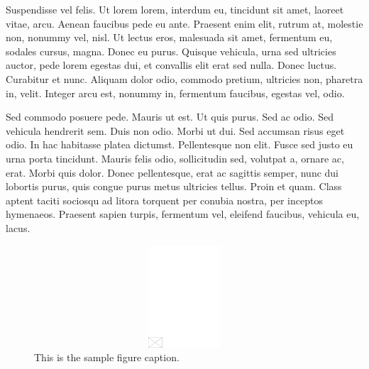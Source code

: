 \documentclass[AMA,STIX1COL]{WileyNJD-SP}
\begin{document}
Suspendisse vel felis. Ut lorem lorem, interdum eu, tincidunt sit amet, laoreet vitae, arcu. Aenean faucibus pede eu
ante. Praesent enim elit, rutrum at, molestie non, nonummy vel, nisl. Ut lectus eros, malesuada sit amet, fermentum
eu, sodales cursus, magna. Donec eu purus. Quisque vehicula, urna sed ultricies auctor, pede lorem egestas dui, et
convallis elit erat sed nulla. Donec luctus. Curabitur et nunc. Aliquam dolor odio, commodo pretium, ultricies non,
pharetra in, velit. Integer arcu est, nonummy in, fermentum faucibus, egestas vel, odio.

Sed commodo posuere pede. Mauris ut est. Ut quis purus. Sed ac odio. Sed vehicula hendrerit sem. Duis non
odio. Morbi ut dui. Sed accumsan risus eget odio. In hac habitasse platea dictumst. Pellentesque non elit. Fusce
sed justo eu urna porta tincidunt. Mauris felis odio, sollicitudin sed, volutpat a, ornare ac, erat. Morbi quis dolor.
Donec pellentesque, erat ac sagittis semper, nunc dui lobortis purus, quis congue purus metus ultricies tellus. Proin
et quam. Class aptent taciti sociosqu ad litora torquent per conubia nostra, per inceptos hymenaeos. Praesent sapien
turpis, fermentum vel, eleifend faucibus, vehicula eu, lacus.

\begin{figure}
\centerline{\includegraphics[width=342pt,height=9pc,draft]{empty}}
\caption{This is the sample figure caption.\label{fig2}}
\end{figure}
\end{document}
